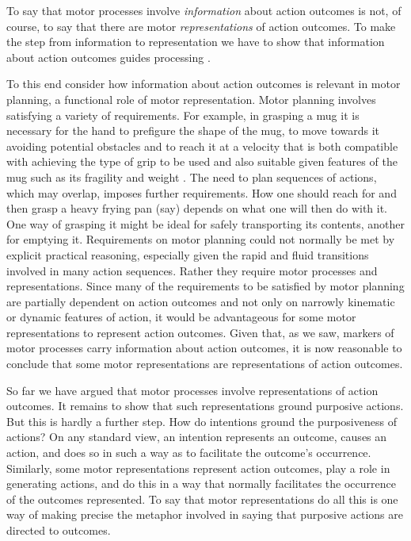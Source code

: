 \documentclass[12pt,\papersize]{extarticle}
\begin{document}
To say that motor processes involve \emph{information} about action outcomes is not, of course, to say that there are motor \emph{representations} of action outcomes.  To make the step from information to representation we have to show that information about action outcomes guides processing \citep[compare][]{Dretske:1988sq}. 

To this end  consider how information about action outcomes is relevant in motor planning, a functional role of motor representation.  Motor planning involves satisfying a variety of requirements. For example, in grasping a mug it is necessary for the hand to prefigure the shape of the mug, to move towards it avoiding potential obstacles and to reach it at a velocity that is both compatible with achieving the type of grip to be used and also suitable given features of the mug such as its fragility and weight \citep{Jeannerod:1995bb,jeannerod:1998nbo}. The need to plan sequences of actions, which may overlap, imposes further requirements. How one should reach for and then grasp a heavy frying pan (say) depends on what one will then do with it. One way of grasping it might be ideal for safely transporting its contents, another for emptying it. 
Requirements on motor planning could not normally be met by explicit practical reasoning, especially given the rapid and fluid transitions involved in many action sequences. 
Rather they require motor processes and representations.
Since 
many of the requirements to be satisfied by motor planning
are partially dependent on action outcomes and not only on  narrowly kinematic or dynamic features of action,
it would be advantageous for some  motor representations to represent action outcomes. 
Given that, as we saw, markers of motor processes carry information about action outcomes, it is now reasonable to conclude that some motor representations are representations of action outcomes.

So far we have argued that motor processes involve representations of action outcomes. It remains to show that such representations ground purposive actions. But this is hardly a further step. How do intentions ground the purposiveness of actions?  On any standard view, an intention represents an outcome, causes an action, and does so in such a way as to facilitate the outcome's occurrence. Similarly, some motor representations  represent action outcomes, play a role in generating actions, and do this in a way that normally facilitates the occurrence of the outcomes represented. To say that motor representations do all this is one way of making precise the metaphor involved in saying that purposive actions are directed to outcomes.  
\end{document}
